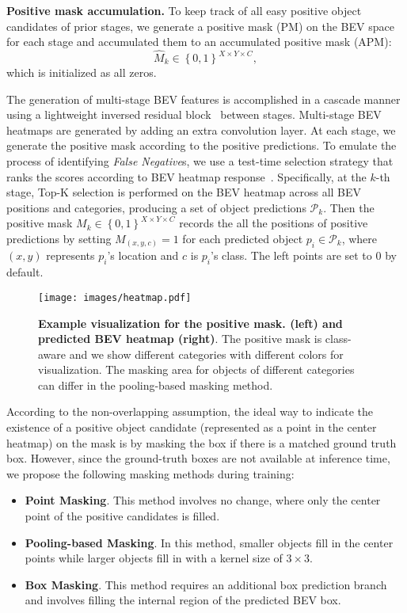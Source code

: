 \documentclass[10pt,twocolumn,letterpaper]{article}
\begin{document}
\vspace{1mm}
\noindent\textbf{Positive mask accumulation.}
To keep track of all easy positive object candidates of prior stages, we generate a positive mask (PM) on the BEV space for each stage and accumulated them to an accumulated positive mask (APM):
$$\hat{M}_{k} \in \left\{0, 1\right\}^{X\times Y\times C},$$ which is initialized as all zeros. 

The generation of multi-stage BEV features is accomplished in a cascade manner using a lightweight inversed residual block~\cite{sandler2018mobilenetv2} between stages. Multi-stage BEV heatmaps are generated by adding an extra convolution layer. At each stage, we generate the positive mask according to the positive predictions. To emulate the process of identifying \textit{False Negative}s, we use a test-time selection strategy that ranks the scores according to BEV heatmap response~\cite{transfusion, centerpoint}. Specifically, at the $k$-th stage, Top-K selection is performed on the BEV heatmap across all BEV positions and categories, producing a set of object predictions $\mathcal{P}_k$. Then the positive mask $M_k\in \left\{0, 1\right\}^{X\times Y\times C}$ records the all the positions of positive predictions by setting $M_{(x,y,c)}=1$ for each predicted object $p_i\in \mathcal{P}_k$, where $(x, y)$ represents $p_i$'s location and $c$ is $p_i$'s class. The left points are set to $0$ by default.



\begin{figure}[t]
	\begin{center}
		\texttt{[image: images/heatmap.pdf]}
	\end{center}
	\caption{\textbf{Example visualization for the positive mask. (left) and predicted BEV heatmap (right)}. The positive mask is class-aware and we show different categories with different colors for visualization. The masking area for objects of different categories can differ in the pooling-based masking method.}
	\label{fig:heatmap}
\end{figure}

According to the non-overlapping assumption, the ideal way to indicate the existence of a positive object candidate (represented as a point in the center heatmap) on the mask is by masking the box if there is a matched ground truth box. However, since the ground-truth boxes are not available at inference time, we propose the following masking methods during training:
\begin{itemize}
    \item \textbf{Point Masking}. This method involves no change, where only the center point of the positive candidates is filled.
    \item \textbf{Pooling-based Masking}. In this method, smaller objects fill in the center points while larger objects fill in with a kernel size of $3\times 3$.
    \item \textbf{Box Masking}. This method requires an additional box prediction branch and involves filling the internal region of the predicted BEV box.
\end{itemize}
\end{document}
